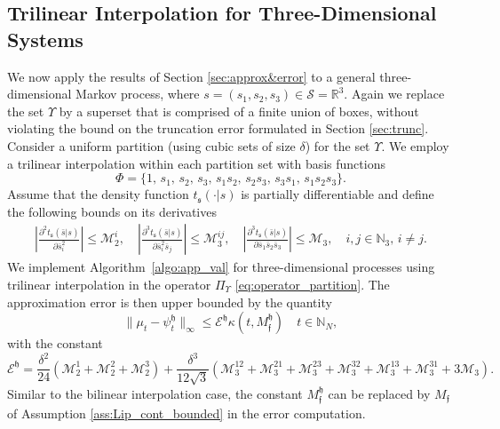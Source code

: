 \documentclass{LMCS}
\begin{document}
\subsection{Trilinear Interpolation for Three-Dimensional Systems}

We now apply the results of Section \ref{sec:approx&error} to a general three-dimensional Markov process, 
where $s = (s_1,s_2,s_3)\in\mathcal S = \mathbb R^3.$ 
Again we replace the set $\Upsilon$ by a superset that is comprised of a finite union of boxes, 
without violating the bound on the truncation error formulated in Section \ref{sec:trunc}. 
Consider a uniform partition (using cubic sets of size $\delta$) for the set $\Upsilon$.  
We employ a trilinear interpolation within each partition set with basis functions
\begin{equation*}
\Phi = \{1,\,s_1,\,s_2,\,s_3,\,s_1s_2,\,s_2s_3,\,s_3s_1,\,s_1s_2s_3\}.
\end{equation*}
Assume that the density function $t_{\mathfrak s}(\cdot|s)$ is partially differentiable and define the following bounds on its derivatives
\begin{align*}
\left|\frac{\partial^2 t_{\mathfrak s}(\bar s|s)}{\partial \bar s_i^2}\right|\le\mathcal M^i_2,\quad
\left|\frac{\partial^3 t_{\mathfrak s}(\bar s|s)}{\partial \bar s_i^2\bar s_j}\right|\le\mathcal M^{ij}_3,\quad
\left|\frac{\partial^3 t_{\mathfrak s}(\bar s|s)}{\partial \bar s_1\bar s_2\bar s_3}\right|\le \mathcal M_3,\quad i,j\in\mathbb N_3,\,i\neq j.    
\end{align*}
We implement Algorithm~\ref{algo:app_val} for three-dimensional processes using trilinear interpolation in the operator $\Pi_\Upsilon$ \eqref{eq:operator_partition}.
The approximation error is then upper bounded by the quantity
\begin{equation*}
\|\mu_t-\psi_t^{\mathfrak h}\|_\infty\le \mathcal E^{\mathfrak h}\kappa(t,M_{\mathfrak f}^{\mathfrak h})\quad t\in\mathbb N_N,
\end{equation*}
with the constant
\begin{equation*}
\mathcal E^{\mathfrak h} = \frac{\delta^2}{24}\left(\mathcal M^1_2+\mathcal M^2_2+\mathcal M^3_2\right)
+\frac{\delta^3}{12\sqrt{3}}\left(\mathcal M^{12}_3+\mathcal M^{21}_3+\mathcal M^{23}_3+\mathcal M^{32}_3+\mathcal M^{13}_3+\mathcal M^{31}_3+3\mathcal M_3\right).
\end{equation*}
Similar to the bilinear interpolation case, the constant $M_{\mathfrak f}^{\mathfrak h}$
can be replaced by $M_{\mathfrak f}$ of Assumption \ref{ass:Lip_cont_bounded} in the error computation.
\end{document}
